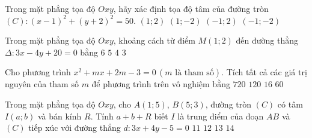 \begin{ex}%
	Trong mặt phẳng tọa độ $Oxy$, hãy xác định tọa độ tâm của đường tròn $(C)\colon (x-1)^2+(y+2)^2=50$.
	\choice
	{$(1;2)$}
	{\True $(1;-2)$}
	{$(-1;2)$}
	{$(-1;-2)$}
\end{ex}
\begin{ex}%
	Trong mặt phẳng tọa độ $Oxy$, khoảng cách từ điểm $M(1;2)$ đến đường thẳng $\Delta \colon 3x-4y+20=0$ bằng
	\choice
	{$6$}
	{$5$}
	{$4$}
	{\True $3$}
\end{ex}
\begin{ex}%
	Cho phương trình $x^2+mx+2m-3=0\,(m\text{ là tham số})$. Tích tất cả các giá trị nguyên của tham số $m$ để phương trình trên vô nghiệm bằng
	\choice
	{$720$}
	{$120$}
	{$16$}
	{\True $60$}
\end{ex}
\begin{ex}%
	Trong mặt phẳng tọa độ $Oxy$, cho $A(1;5)$, $B(5;3)$, đường tròn $(C)$ có tâm $I(a;b)$ và bán kính $R$. Tính $a+b+R$ biết $I$ là trung điểm của đoạn $AB$ và $(C)$ tiếp xúc với đường thẳng $d\colon 3x+4y-5=0$
	\choice
	{\True $11$}
	{$12$}
	{$13$}
	{$14$}
\end{ex}


